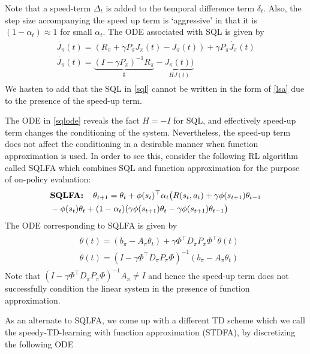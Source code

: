 Note that a speed-term $\Delta_t$ is added to the temporal difference term $\delta_t$. Also, the step size accompanying the speed up term is `aggressive’ in that it is $(1-\alpha_t)\approx 1$ for small $\alpha_t$. The ODE associated with SQL is given by
\begin{align}
\begin{split}
\dot{J_\pi}(t)=(R_\pi+\gamma P_\pi J_\pi(t) -J_\pi(t))+\gamma P_\pi\dot{J_\pi}(t)\\
\dot{J_\pi}(t)=\underbrace{(I-\gamma P_\pi)^{-1}R_\pi}_{\text{g}}-\underbrace{J_\pi(t))}_{HJ(t)}
\end{split}
\end{align}
We hasten to add that the SQL in \eqref{sql} cannot be written in the form of \eqref{lsa} due to the presence of the speed-up term.\par 
The ODE in \eqref{sqlode} reveals the fact $H=-I$ for SQL, and effectively speed-up term changes the conditioning of the system. Nevertheless, the speed-up term does not affect the conditioning in a desirable manner when function approximation is used. In order to see this, consider the following RL algorithm called SQLFA which combines SQL and function approximation for the purpose of on-policy evaluation:
\begin{align}\label{sqlfa}
\begin{split}
&\textbf{SQLFA:\quad}\theta_{t+1}=\theta_t+\phi(s_t)^\top \alpha_t\big(R(s_t,a_t)+\gamma \phi(s_{t+1})\theta_{t-1}\\&-\phi(s_t)\theta_t +(1-\alpha_t)(\gamma \phi(s_{t+1})\theta_t-\gamma \phi(s_{t+1})\theta_{t-1}\big)
\end{split}
\end{align}
The ODE corresponding to SQLFA is given by
\begin{align}
\begin{split}
&\dot{\theta}(t)=(b_\pi-A_\pi\theta_t)+\gamma\Phi^\top D_\pi P_\pi\Phi^\top\dot{\theta}(t)\\
&\dot{\theta}(t)=(I-\gamma\Phi^\top D_\pi P_\pi\Phi)^{-1}(b_\pi-A_\pi\theta_t)
\end{split}
\end{align}
Note that $(I-\gamma\Phi^\top D_\pi P_\pi\Phi)^{-1}A_\pi\neq I$ and hence the speed-up term does not successfully condition the linear system in the presence of function approximation.\par
As an alternate to SQLFA, we come up with a different TD scheme which we call the speedy-TD-learning with function approximation (STDFA), by discretizing the following ODE
